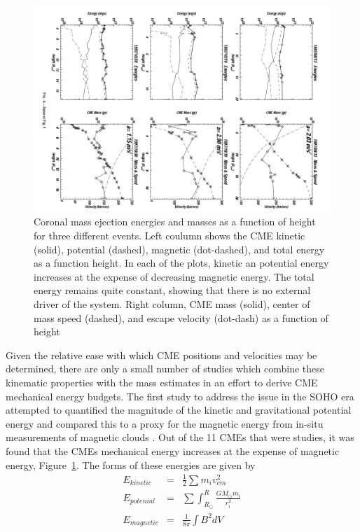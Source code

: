 \begin{figure}[t!]
\begin{center}
\includegraphics[scale=0.4, angle=90, trim=1cm 0cm 2cm 2cm]{images/cme_energies}
\caption[CME energies and masses as a function of height]{Coronal mass ejection energies and masses as a function of height for three different events.
Left coulumn shows the CME kinetic (solid), potential (dashed), magnetic (dot-dashed), and total energy as a function
height. In each of the plots, kinetic an potential energy increases at the expense of decreasing magnetic energy. The total energy 
remains quite constant, showing that there is no external driver of the system. Right column, CME mass (solid), center of mass speed (dashed), and escape velocity (dot-dash) as a function of height \citep{vou00}}
\label{fig:cme_energies}
\end{center} 
\end{figure}
Given the relative ease with which CME positions and velocities may be determined, there are only a small number of studies which combine these kinematic properties with the mass estimates in an effort to derive CME mechanical energy budgets. The first study to address the issue in the SOHO era attempted to quantified the magnitude of the kinetic and gravitational potential energy and compared this to a proxy for the magnetic energy from in-situ measurements of magnetic clouds \citep{vou00}. Out of the 11 CMEs that were studies, it was found that the CMEs mechanical energy increases at the expense of magnetic energy, Figure~\ref{fig:cme_energies}. The forms of these energies are given by
\begin{eqnarray}
E_{kinetic} & = & \frac{1}{2}\sum m_i v_{cm}^2 \\
E_{potenial} & = & \sum \int_{R_{\odot}}^{R} \frac{GM_{\odot}m_i}{r^2_i}\\
E_{magnetic} & = & \frac{1}{8\pi}\int B^2 dV
\end{eqnarray}
